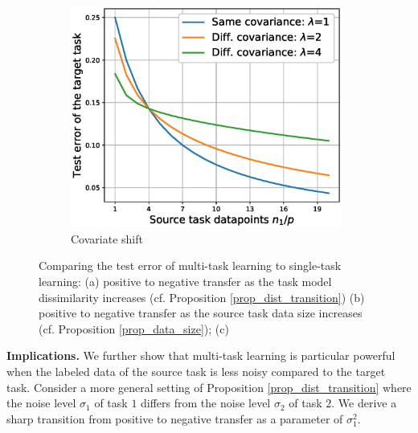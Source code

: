 \begin{figure}
\begin{subfigure}[b]{0.32\textwidth}
		\centering
		\includegraphics[width=0.98\textwidth]{figures/complementary.eps}
		\caption{Covariate shift}
		\label{fig_covariate}
	\end{subfigure}
	\caption{Comparing the test error of multi-task learning to single-task learning: (a) positive to negative transfer as the task model dissimilarity increases (cf. Proposition \ref{prop_dist_transition}) (b) positive to negative transfer as the source task data size increases (cf. Proposition \ref{prop_data_size}); (c) }
	\label{fig_model_shift_phasetrans}
\end{figure}

\textbf{Implications.}
We further show that multi-task learning is particular powerful when the labeled data of the source task is less noisy compared to the target task.
Consider a more general setting of Proposition \ref{prop_dist_transition} where the noise level $\sigma_1$ of task $1$ differs from the noise level $\sigma_2$ of task $2$.
We derive a sharp transition from positive to negative transfer as a parameter of $\sigma_1^2$.


